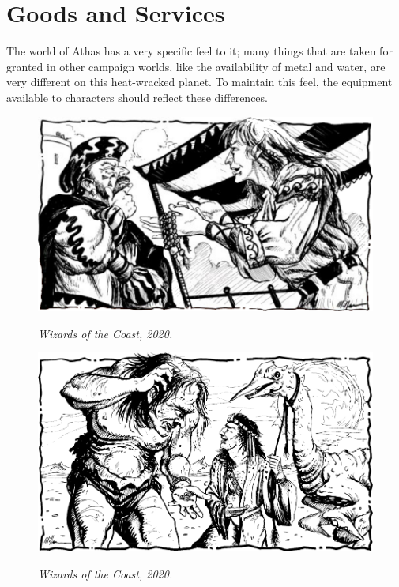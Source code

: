 \section{Goods and Services}
The world of Athas has a very specific feel to it; many things that are taken for granted in other campaign worlds, like the availability of metal and water, are very different on this heat-wracked planet. To maintain this feel, the equipment available to characters should reflect these differences.

\begin{figure}[t!]
\centering
\includegraphics[width=\textwidth]{images/merchant-1.png}
\par\textit{\small\textcopyright Wizards of the Coast, 2020.}
\end{figure}









\begin{figure}[b!]
\centering
\includegraphics[width=\textwidth]{images/merchant-3.png}
\par\textit{\small\textcopyright Wizards of the Coast, 2020.}
\end{figure}



